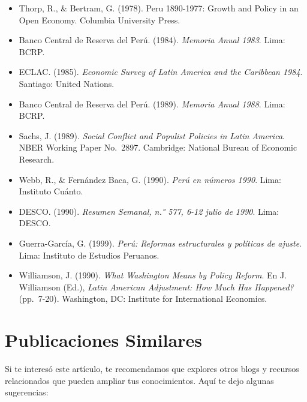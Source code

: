 \documentclass[
  jou,
  floatsintext,
  longtable,
  a4paper,
  nolmodern,
  notxfonts,
  notimes,
  12pt,
  colorlinks=true,linkcolor=blue,citecolor=blue,urlcolor=blue]{apa7}
\begin{document}
\begin{itemize}
  Mitre, E. (2004). Introducción a la Historia de la Edad Media europea,
  Madrid: Istmo.
\item
  Thorp, R., \& Bertram, G. (1978). Peru 1890-1977: Growth and Policy in
  an Open Economy. Columbia University Press.
\item
  Banco Central de Reserva del Perú. (1984). \emph{Memoria Anual 1983}.
  Lima: BCRP.
\item
  ECLAC. (1985). \emph{Economic Survey of Latin America and the
  Caribbean 1984}. Santiago: United Nations.
\item
  Banco Central de Reserva del Perú. (1989). \emph{Memoria Anual 1988}.
  Lima: BCRP.
\item
  Sachs, J. (1989). \emph{Social Conflict and Populist Policies in Latin
  America}. NBER Working Paper No.~2897. Cambridge: National Bureau of
  Economic Research.
\item
  Webb, R., \& Fernández Baca, G. (1990). \emph{Perú en números 1990}.
  Lima: Instituto Cuánto.
\item
  DESCO. (1990). \emph{Resumen Semanal, n.° 577, 6-12 julio de 1990}.
  Lima: DESCO.
\item
  Guerra-García, G. (1999). \emph{Perú: Reformas estructurales y
  políticas de ajuste}. Lima: Instituto de Estudios Peruanos.
\item
  Williamson, J. (1990). \emph{What Washington Means by Policy Reform}.
  En J. Williamson (Ed.), \emph{Latin American Adjustment: How Much Has
  Happened?} (pp.~7-20). Washington, DC: Institute for International
  Economics.
\end{itemize}

\section{Publicaciones Similares}\label{publicaciones-similares}

Si te interesó este artículo, te recomendamos que explores otros blogs y
recursos relacionados que pueden ampliar tus conocimientos. Aquí te dejo
algunas sugerencias:
\end{document}

